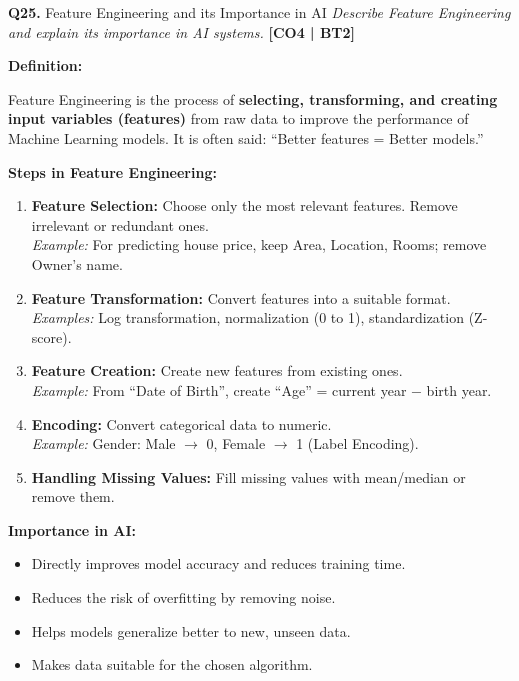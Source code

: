 \documentclass[12pt,a4paper]{article}
\newcommand{\Qno}[1]{\textbf{\color{darkred}Q#1.}}
\newcommand{\term}[1]{\textbf{\color{headingcolor}#1}}
\begin{document}
\vspace{8pt}

\begin{questionbox}{\Qno{25} Feature Engineering and its Importance in AI}
\textit{Describe Feature Engineering and explain its importance in AI systems.} \hfill \textbf{[CO4 | BT2]}
\end{questionbox}

\begin{answerenv}

\textbf{\color{headingcolor}Definition:}

Feature Engineering is the process of \textbf{selecting, transforming, and creating input variables (features)} from raw data to improve the performance of Machine Learning models. It is often said: ``Better features = Better models.''

\vspace{6pt}
\textbf{\color{headingcolor}Steps in Feature Engineering:}
\begin{enumerate}[leftmargin=1.8em, itemsep=4pt]
  \item \term{Feature Selection:} Choose only the most relevant features. Remove irrelevant or redundant ones.\\
  \textit{Example:} For predicting house price, keep Area, Location, Rooms; remove Owner's name.

  \item \term{Feature Transformation:} Convert features into a suitable format.\\
  \textit{Examples:} Log transformation, normalization (0 to 1), standardization (Z-score).

  \item \term{Feature Creation:} Create new features from existing ones.\\
  \textit{Example:} From ``Date of Birth'', create ``Age'' = current year $-$ birth year.

  \item \term{Encoding:} Convert categorical data to numeric.\\
  \textit{Example:} Gender: Male $\to$ 0, Female $\to$ 1 (Label Encoding).

  \item \term{Handling Missing Values:} Fill missing values with mean/median or remove them.
\end{enumerate}

\vspace{4pt}
\textbf{\color{headingcolor}Importance in AI:}
\begin{itemize}[leftmargin=1.5em, itemsep=2pt]
  \item Directly improves model accuracy and reduces training time.
  \item Reduces the risk of overfitting by removing noise.
  \item Helps models generalize better to new, unseen data.
  \item Makes data suitable for the chosen algorithm.
\end{itemize}


\end{answerenv}
\end{document}

